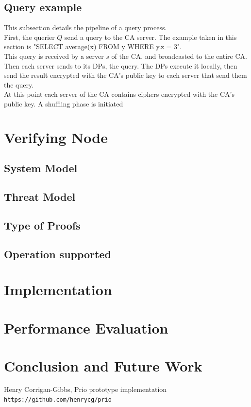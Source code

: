 \documentclass{article}
\begin{document}
\subsection{Query example}
This subsection details the pipeline of a query process.\\
First, the querier $Q$ send a query to the CA server. The example taken in this section is "SELECT average(x) FROM y WHERE y.z = 3".\\
This query is received by a server $s$ of the CA, and broadcasted to the entire CA. Then each server sends to its DPs, the query. The DPs execute it locally, then send the result encrypted with the CA's public key to each server that send them the query.\\
At this point each server of the CA contains ciphers encrypted with the CA's public key. A shuffling phase is initiated

\section{Verifying Node}
\subsection{System Model}
\subsection{Threat Model}
\subsection{Type of Proofs}
\subsection{Operation supported}

\section{Implementation}

\section{Performance Evaluation}
\section{Conclusion and Future Work}
\begin{thebibliography}{9}
Henry Corrigan-Gibbs, Prio prototype implementation\\
\texttt{https://github.com/henrycg/prio}
\end{thebibliography}
\end{document}
